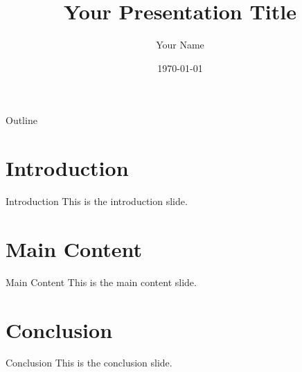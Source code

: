 \documentclass{beamer}
\title{Your Presentation Title}
\author{Your Name}
\institute{Your Institution}
\date{\today}
\begin{document}
\begin{frame}
	\titlepage
\end{frame}

\begin{frame}{Outline}
	\tableofcontents
\end{frame}

\section{Introduction}
\begin{frame}{Introduction}
	This is the introduction slide.
\end{frame}

\section{Main Content}
\begin{frame}{Main Content}
	This is the main content slide.
\end{frame}

\section{Conclusion}
\begin{frame}{Conclusion}
	This is the conclusion slide.
\end{frame}
\end{document}
